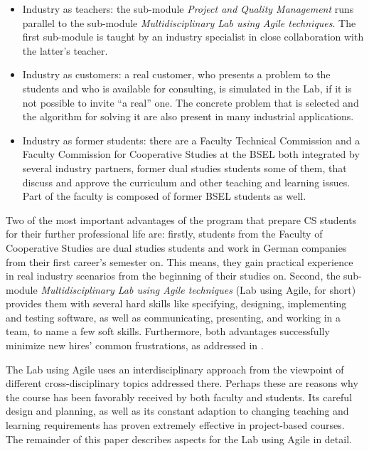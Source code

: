 \documentclass[conference]{IEEEtran}
\begin{document}
\begin{itemize}
  \item Industry as teachers: the sub-module \textit{Project and Quality Management} runs parallel to the sub-module \textit{Multidisciplinary Lab using Agile techniques}. The first sub-module is taught by an industry specialist in close collaboration with the latter's teacher.
  \item Industry as customers: a real customer, who presents a problem to the students and who is available for consulting, is simulated in the Lab, if it is not possible to invite ``a real'' one. The concrete problem that is selected and the algorithm for solving it are also present in many industrial applications.
  \item Industry as former students: there are a Faculty Technical Commission and a Faculty Commission for Cooperative Studies at the BSEL both integrated by several industry partners, former dual studies students some of them, that discuss and approve the curriculum and other teaching and learning issues. Part of the faculty is composed of former BSEL students as well.
\end{itemize}

Two of the most important advantages of the program that prepare CS students for their further professional life are: firstly, students from the Faculty of Cooperative Studies are dual studies students and work in German companies from their first career's semester on. This means, they gain practical experience in real industry scenarios from the beginning of their studies on. Second, the sub-module \textit{Multidisciplinary Lab using Agile techniques} (Lab using Agile, for short) provides them with several hard skills like specifying, designing, implementing and testing software, as well as communicating, presenting, and working in a team, to name a few soft skills. Furthermore, both advantages successfully minimize new hires' common frustrations, as addressed in \cite{Co02}. 

The Lab using Agile uses an interdisciplinary approach from the viewpoint of different cross-disciplinary topics addressed there. Perhaps these are reasons why the course has been favorably received by both faculty and students. Its careful design and planning, as well as its constant adaption to changing teaching and learning requirements has proven extremely effective in project-based courses. The remainder of this paper describes aspects for the Lab using Agile in detail.


\end{document}
